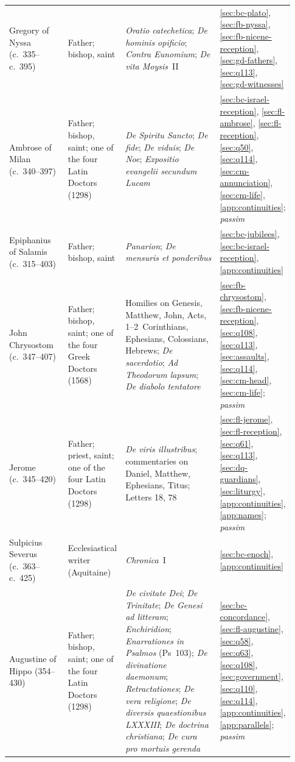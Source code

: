 \begin{longtable}{@{}>{\raggedright\arraybackslash}p{0.21\linewidth}>{\raggedright\arraybackslash}p{0.20\linewidth}>{\raggedright\arraybackslash}p{0.35\linewidth}>{\raggedright\arraybackslash}p{0.17\linewidth}@{}}
Gregory of Nyssa (c.~335--c.~395) & Father; bishop, saint & \emph{Oratio catechetica}; \emph{De hominis opificio}; \emph{Contra Eunomium}; \emph{De vita Moysis}~II & \ref{sec:bc-plato}, \ref{sec:fb-nyssa}, \ref{sec:fb-nicene-reception}, \ref{sec:gd-fathers}, \ref{sec:q113}, \ref{sec:gd-witnesses}\\
Ambrose of Milan (c.~340--397) & Father; bishop, saint; one of the four Latin Doctors (1298) & \emph{De Spiritu Sancto}; \emph{De fide}; \emph{De viduis}; \emph{De Noe}; \emph{Expositio evangelii secundum Lucam} & \ref{sec:bc-israel-reception}, \ref{sec:fl-ambrose}, \ref{sec:fl-reception}, \ref{sec:q50}, \ref{sec:q114}, \ref{sec:cm-annunciation}, \ref{sec:cm-life}, \ref{app:continuities}; \emph{passim}\\
Epiphanius of Salamis (c.~315--403) & Father; bishop, saint & \emph{Panarion}; \emph{De mensuris et ponderibus} & \ref{sec:bc-jubilees}, \ref{sec:bc-israel-reception}, \ref{app:continuities}\\
John Chrysostom (c.~347--407) & Father; bishop, saint; one of the four Greek Doctors (1568) & Homilies on Genesis, Matthew, John, Acts, 1--2~Corinthians, Ephesians, Colossians, Hebrews; \emph{De sacerdotio}; \emph{Ad Theodorum lapsum}; \emph{De diabolo tentatore} & \ref{sec:fb-chrysostom}, \ref{sec:fb-nicene-reception}, \ref{sec:q108}, \ref{sec:q113}, \ref{sec:assaults}, \ref{sec:q114}, \ref{sec:cm-head}, \ref{sec:cm-life}; \emph{passim}\\
Jerome (c.~345--420) & Father; priest, saint; one of the four Latin Doctors (1298) & \emph{De viris illustribus}; commentaries on Daniel, Matthew, Ephesians, Titus; Letters 18, 78 & \ref{sec:fl-jerome}, \ref{sec:fl-reception}, \ref{sec:q61}, \ref{sec:q113}, \ref{sec:dq-guardians}, \ref{sec:liturgy}, \ref{app:continuities}, \ref{app:names}; \emph{passim}\\
Sulpicius Severus (c.~363--c.~425) & Ecclesiastical writer (Aquitaine) & \emph{Chronica}~I & \ref{sec:bc-enoch}, \ref{app:continuities}\\
Augustine of Hippo (354--430) & Father; bishop, saint; one of the four Latin Doctors (1298) & \emph{De civitate Dei}; \emph{De Trinitate}; \emph{De Genesi ad litteram}; \emph{Enchiridion}; \emph{Enarrationes in Psalmos} (Ps~103); \emph{De divinatione daemonum}; \emph{Retractationes}; \emph{De vera religione}; \emph{De diversis quaestionibus LXXXIII}; \emph{De doctrina christiana}; \emph{De cura pro mortuis gerenda} & \ref{sec:bc-concordance}, \ref{sec:fl-augustine}, \ref{sec:q58}, \ref{sec:q63}, \ref{sec:q108}, \ref{sec:government}, \ref{sec:q110}, \ref{sec:q114}, \ref{app:continuities}, \ref{app:parallels}; \emph{passim}\\

\end{longtable}
